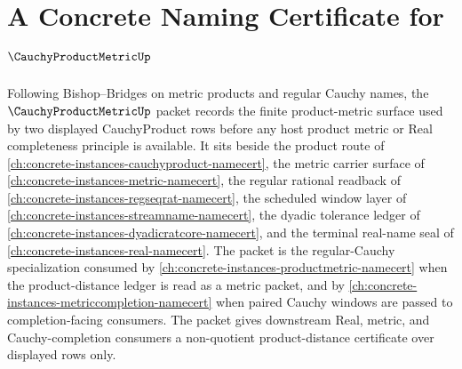 \chapter{A Concrete Naming Certificate for $\CauchyProductMetricUp$}
\label{ch:concrete-instances-cauchy-product-metric-namecert}

Following Bishop--Bridges on metric products and regular Cauchy names, the $\CauchyProductMetricUp$ packet records the finite product-metric surface used by two displayed CauchyProduct rows before any host product metric or Real completeness principle is available. It sits beside the product route of \autoref{ch:concrete-instances-cauchyproduct-namecert}, the metric carrier surface of \autoref{ch:concrete-instances-metric-namecert}, the regular rational readback of \autoref{ch:concrete-instances-regseqrat-namecert}, the scheduled window layer of \autoref{ch:concrete-instances-streamname-namecert}, the dyadic tolerance ledger of \autoref{ch:concrete-instances-dyadicratcore-namecert}, and the terminal real-name seal of \autoref{ch:concrete-instances-real-namecert}. The packet is the regular-Cauchy specialization consumed by \autoref{ch:concrete-instances-productmetric-namecert} when the product-distance ledger is read as a metric packet, and by \autoref{ch:concrete-instances-metriccompletion-namecert} when paired Cauchy windows are passed to completion-facing consumers. The packet gives downstream Real, metric, and Cauchy-completion consumers a non-quotient product-distance certificate over displayed rows only.

